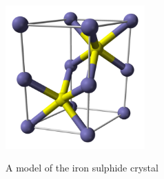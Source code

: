  \begin{minipage}{.5\textwidth}
  \begin{center}
   \includegraphics[width=0.4\textwidth]{photos/FeS_wikipedia.png}\\
\begin{caption}A model of the iron sulphide crystal\end{caption}
  \end{center}
 \end{minipage}

